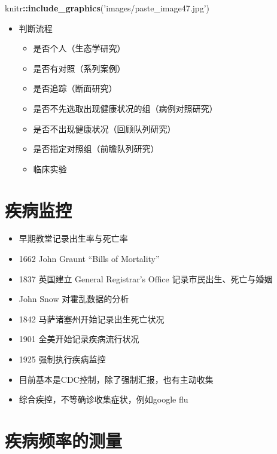 \documentclass[]{book}
\newenvironment{Shaded}{\begin{snugshade}}{\end{snugshade}}
\newcommand{\KeywordTok}[1]{\textcolor[rgb]{0.13,0.29,0.53}{\textbf{#1}}}
\newcommand{\NormalTok}[1]{#1}
\newcommand{\OperatorTok}[1]{\textcolor[rgb]{0.81,0.36,0.00}{\textbf{#1}}}
\newcommand{\StringTok}[1]{\textcolor[rgb]{0.31,0.60,0.02}{#1}}
\providecommand{\tightlist}{%
  \setlength{\itemsep}{0pt}\setlength{\parskip}{0pt}}
\begin{document}
\begin{Shaded}
\begin{Highlighting}[]
\NormalTok{knitr}\OperatorTok{::}\KeywordTok{include_graphics}\NormalTok{(}\StringTok{'images/paste_image47.jpg'}\NormalTok{)}
\end{Highlighting}
\end{Shaded}

\begin{itemize}
\tightlist
\item
  判断流程

  \begin{itemize}
  \tightlist
  \item
    是否个人（生态学研究）
  \item
    是否有对照（系列案例）
  \item
    是否追踪（断面研究）
  \item
    是否不先选取出现健康状况的组（病例对照研究）
  \item
    是否不出现健康状况（回顾队列研究）
  \item
    是否指定对照组（前瞻队列研究）
  \item
    临床实验
  \end{itemize}
\end{itemize}

\hypertarget{ux75beux75c5ux76d1ux63a7}{%
\section{疾病监控}\label{ux75beux75c5ux76d1ux63a7}}

\begin{itemize}
\tightlist
\item
  早期教堂记录出生率与死亡率
\item
  1662 John Graunt ``Bills of Mortality''
\item
  1837 英国建立 General Registrar's Office 记录市民出生、死亡与婚姻
\item
  John Snow 对霍乱数据的分析
\item
  1842 马萨诸塞州开始记录出生死亡状况
\item
  1901 全美开始记录疾病流行状况
\item
  1925 强制执行疾病监控
\item
  目前基本是CDC控制，除了强制汇报，也有主动收集
\item
  综合疾控，不等确诊收集症状，例如google flu
\end{itemize}

\hypertarget{ux75beux75c5ux9891ux7387ux7684ux6d4bux91cf}{%
\section{疾病频率的测量}\label{ux75beux75c5ux9891ux7387ux7684ux6d4bux91cf}}
\end{document}
